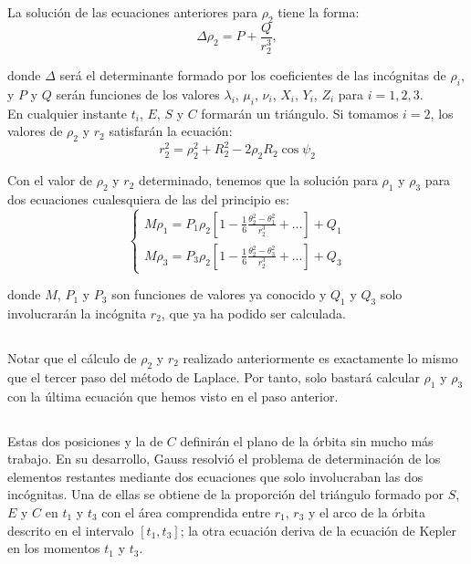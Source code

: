 \documentclass[11pt]{article}
\begin{document}
La solución de las ecuaciones anteriores para $\rho_2$ tiene la forma:
\[
\Delta\rho_2=P+\frac{Q}{r_2^3},
\]

\noindent donde $\Delta$ será el determinante formado por los coeficientes de las incógnitas de $\rho_i$, y $P$ y $Q$ serán funciones de los valores $\lambda_i$, $\mu_i$, $\nu_i$, $X_i$, $Y_i$, $Z_i$ para $i=1,2,3$.\\

En cualquier instante $t_i$, $E$, $S$ y $C$ formarán un triángulo. Si tomamos $i=2$, los valores de $\rho_2$ y $r_2$ satisfarán la ecuación:
\[
r_2^2=\rho_2^2+R_2^2-2\rho_2R_2\cos{\psi_2}
\]

Con el valor de $\rho_2$ y $r_2$ determinado, tenemos que la solución para $\rho_1$ y $\rho_3$ para dos ecuaciones cualesquiera de las del principio es:
\[
\left\{
\begin{array}{l}
	M\rho_1=P_1\rho_2[1-\frac{1}{6}\frac{\theta_2^2-\theta_1^2}{r_2^3}+...]+Q_1\\
	M\rho_3=P_3\rho_2[1-\frac{1}{6}\frac{\theta_2^2-\theta_3^2}{r_2^3}+...]+Q_3
\end{array}
\right.
\]

\noindent donde $M$, $P_1$ y $P_3$ son funciones de valores ya conocido y $Q_1$ y $Q_3$ solo involucrarán la incógnita $r_2$, que ya ha podido ser calculada.\\

\subsection{}
Notar que el cálculo de $\rho_2$ y $r_2$ realizado anteriormente es exactamente lo mismo que el tercer paso del método de Laplace. Por tanto, solo bastará calcular $\rho_1$ y $\rho_3$ con la última ecuación que hemos visto en el paso anterior.\\

\subsection{}
Estas dos posiciones y la de $C$ definirán el plano de la órbita sin mucho más trabajo. En su desarrollo, Gauss resolvió el problema de determinación de los elementos restantes mediante dos ecuaciones que solo involucraban las dos incógnitas. Una de ellas se obtiene de la proporción del triángulo formado por $S$, $E$ y $C$ en $t_1$ y $t_3$ con el área comprendida entre $r_1$, $r_3$ y el arco de la órbita descrito en el intervalo $[t_1,t_3]$; la otra ecuación deriva de la ecuación de Kepler en los momentos $t_1$ y $t_3$.\\
\end{document}
